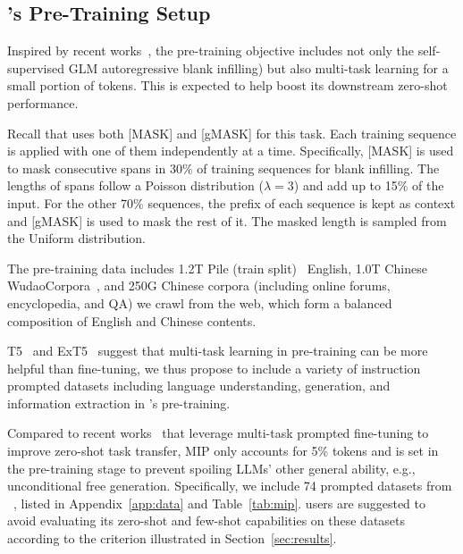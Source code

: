 \vspace{-2mm}
\subsection{\glm's Pre-Training Setup} \label{sec:training_objective}
\vspace{-2mm}

Inspired by recent works~\citep{aribandi2022ext5,wei2022finetuned,sanh2022multitask}, the \glm pre-training objective includes not only the self-supervised GLM autoregressive blank infilling) but also multi-task learning for a small portion of tokens. 
This is expected to help boost its downstream zero-shot performance. 

Recall that \glm uses both [MASK] and [gMASK] for this task. 
Each training sequence is applied with one of them independently at a time.
Specifically, [MASK] is used to mask consecutive spans in 30\% of training sequences for blank infilling. The lengths of spans follow a Poisson distribution ($\lambda=3$) and add up to 15\% of the input. 
For the other 70\% sequences, the prefix of each sequence is kept as context and [gMASK] is used to mask the rest of it. 
The masked length is sampled from the Uniform distribution.

The pre-training data includes 1.2T Pile (train split)~\citep{gao2020pile} English, 1.0T Chinese WudaoCorpora~\citep{yuan2021wudaocorpora}, %
and 250G Chinese corpora (including online forums, encyclopedia, and QA) we crawl from the web, which form a balanced composition of English and Chinese contents.

T5~\citep{raffel2020exploring} and ExT5~\citep{aribandi2022ext5} suggest that multi-task learning in pre-training can be more helpful than fine-tuning, we thus propose to include a variety of instruction prompted datasets including language understanding, generation, and information extraction in \glm's pre-training.

Compared to recent works~\citep{wei2022finetuned,sanh2022multitask} that leverage multi-task prompted fine-tuning to improve zero-shot task transfer, MIP only accounts for 5\% tokens and is set in the pre-training stage to prevent spoiling LLMs' other general ability, e.g., unconditional free generation.
Specifically, we include 74 prompted datasets from ~\citep{sanh2022multitask,wang2022deepstruct}, listed in Appendix~\ref{app:data} and Table~\ref{tab:mip}. 
\glm users are suggested to {avoid evaluating its zero-shot and few-shot capabilities on these datasets} according to the criterion illustrated in Section~\ref{sec:results}.

